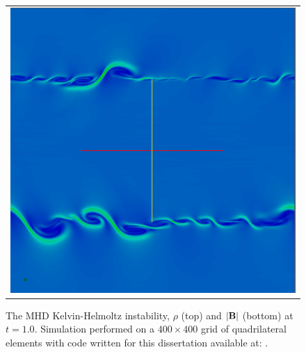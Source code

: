 \begin{figure}[htbp]
\begin{center}
\begin{tabular}{c}
\includegraphics[width=0.4\textheight]{fig/kh_mhd_bmag_0100.png} 
\end{tabular}
\caption{The MHD Kelvin-Helmoltz instability, $\rho$ (top) and $|\mathbf{B}|$ (bottom) at $t=1.0$.  Simulation performed on a $400 \times 400$ grid of quadrilateral elements with code written for this dissertation available at: \protect\gitrepo.}
\end{center} 
\label{fig:kh_instability_mhd}
\figSpace
\end{figure}

